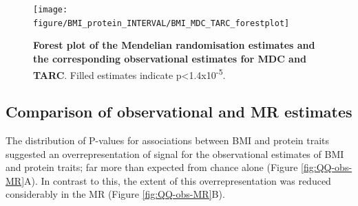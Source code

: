 \documentclass[11pt,twoside]{bristolthesis}
\begin{document}
\begin{figure}
\texttt{[image: figure/BMI\_protein\_INTERVAL/BMI\_MDC\_TARC\_forestplot]} \caption[Forest plot of the strongest BMI-protein Mendelian randomisation estimates and the corresponding observational estimates]{\textbf{Forest plot of the Mendelian randomisation estimates and the corresponding observational estimates for MDC and TARC}. Filled estimates indicate p\textless1.4x10\textsuperscript{-5}.}\label{fig:ObsMRforestplot-MDC-TARC}
\end{figure}
\hypertarget{comparison-of-observational-and-mr-estimates}{%
\subsection{Comparison of observational and MR estimates}\label{comparison-of-observational-and-mr-estimates}}

The distribution of P-values for associations between BMI and protein traits suggested an overrepresentation of signal for the observational estimates of BMI and protein traits; far more than expected from chance alone (Figure \ref{fig:QQ-obs-MR}A). In contrast to this, the extent of this overrepresentation was reduced considerably in the MR (Figure \ref{fig:QQ-obs-MR}B).
\end{document}
